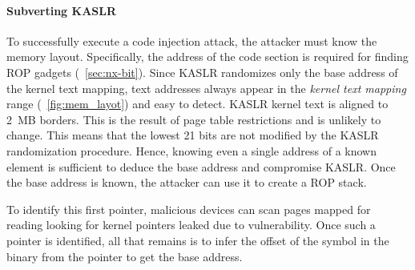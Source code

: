 

\paragraph{Subverting KASLR}
To successfully execute a code injection attack, the attacker must know the memory layout. Specifically, the address of the code section is required for finding ROP gadgets (\DIFdelbegin {}\DIFdelend \DIFaddbegin {}\DIFaddend ~\ref{sec:nx-bit}). 
Since KASLR randomizes only the base address of the kernel text mapping, text addresses always appear in the \textit{kernel text mapping} range (\DIFdelbegin {}\DIFdelend \DIFaddbegin {}\DIFaddend ~\ref{fig:mem_layot}) and \DIFdelbegin {}\DIFdelend \DIFaddbegin {}\DIFaddend easy to detect. KASLR kernel text is aligned to 2~MB borders. This is the result of page table restrictions and is unlikely to change. This means that the lowest 21 bits are not modified by the KASLR randomization procedure. Hence, knowing even a single address of a known element is sufficient to deduce the base address and compromise KASLR. Once the base address is known, the attacker can use it to create a ROP stack.

To identify this first pointer, malicious devices can scan \DIFaddbegin {}\DIFaddend pages mapped for reading \DIFaddbegin {}\DIFaddend looking for kernel pointers \DIFdelbegin \DIFdel{, }\DIFdelend \DIFaddbegin {}\DIFaddend leaked due to \subpage{} vulnerability. Once such a pointer is identified, all that remains is to infer the offset of the symbol in the binary from the pointer to get the base address.%

